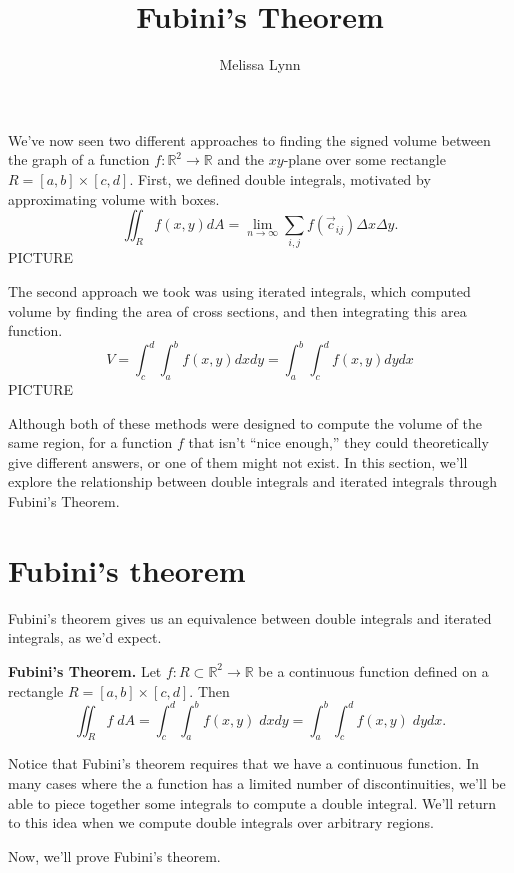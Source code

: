 \documentclass{ximera}
\title{Fubini's Theorem}
\author{Melissa Lynn}
\begin{document}
  
\begin{abstract}  
\end{abstract}  
\maketitle  

We've now seen two different approaches to finding the signed volume between the graph of a function $f:\mathbb{R}^2\rightarrow\mathbb{R}$ and the $xy$-plane over some rectangle $R = [a,b]\times [c,d]$. First, we defined double integrals, motivated by approximating volume with boxes.
\[
\iint_R f(x,y) dA = \lim_{n\rightarrow \infty} \sum_{i,j} f(\vec{c}_{ij})\Delta x\Delta y.
\]
PICTURE

The second approach we took was using iterated integrals, which computed volume by finding the area of cross sections, and then integrating this area function.
\[
V = \int_c^d\int_a^b f(x,y)dxdy = \int_a^b\int_c^d f(x,y)dydx
\]
PICTURE

Although both of these methods were designed to compute the volume of the same region, for a function $f$ that isn't ``nice enough,'' they could theoretically give different answers, or one of them might not exist. In this section, we'll explore the relationship between double integrals and iterated integrals through Fubini's Theorem.

\section*{Fubini's theorem}

Fubini's theorem gives us an equivalence between double integrals and iterated integrals, as we'd expect.

\begin{theorem}
\textbf{Fubini's Theorem.} Let $f:R\subset\mathbb{R}^2\rightarrow\mathbb{R}$ be a continuous function defined on a rectangle $R = [a,b]\times [c,d]$. Then
\[
\iint_R f\;dA = \int_c^d\int_a^b f(x,y)\;dxdy = \int_a^b\int_c^d f(x,y)\;dydx.
\]
\end{theorem}

Notice that Fubini's theorem requires that we have a continuous function. In many cases where the a function has a limited number of discontinuities, we'll be able to piece together some integrals to compute a double integral. We'll return to this idea when we compute double integrals over arbitrary regions.

Now, we'll prove Fubini's theorem.
\end{document}
